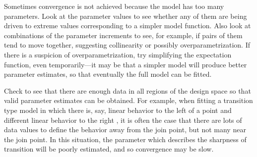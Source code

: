 Sometimes convergence is not achieved because the model has too
many parameters.
Look at the parameter values to see whether any of them are being
driven to extreme values corresponding to a simpler model function.
Also look at combinations of the parameter increments to see, for
example, if pairs of them tend to move together, suggesting
collinearity or possibly overparametrization.
If there is a suspicion of overparametrization, try simplifying
the expectation function, even temporarily---it may be that a
simpler model will produce better parameter estimates, so that
eventually the full model can be fitted.

Check to see that there are enough data in all regions of
the design space so that valid parameter estimates can be obtained.
For example, when fitting a transition type model in which there
is, say, linear behavior to the left of a point and different
linear behavior to the right
\cite{baco:watt:1971,hink:1969,watt:baco:1974},
it is often the case that there are
lots of data values to define the behavior away from the join
point, but not many near the join point.
In this situation, the parameter which describes the sharpness of
transition will be poorly estimated, and so convergence may be
slow.

